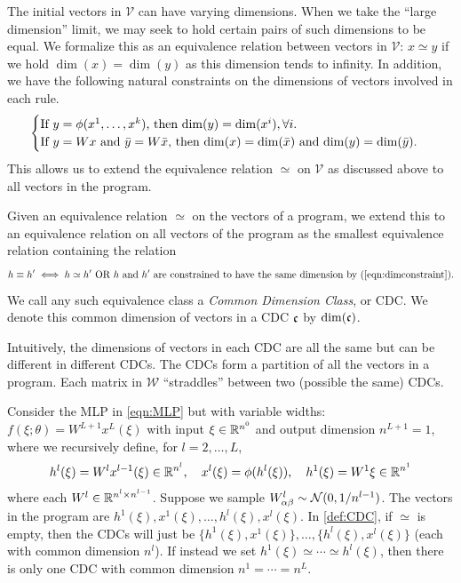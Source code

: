 \documentclass[main.tex]{subfiles}
\begin{document}
The initial vectors in $\mathcal{V}$ can have varying dimensions. When we take the ``large dimension'' limit, we may seek to hold certain pairs of such dimensions to be equal. We formalize this as an equivalence relation between vectors in $\mathcal{V}$: $x\simeq y$ if we hold $\dim(x)=\dim(y)$ as this dimension tends to infinity.
In addition, we have the following natural constraints on the dimensions of vectors involved in each rule.
\begin{equation}
\begin{cases}
\text{If \ensuremath{y=\phi(x^{1},\ldots,x^{k})}, then \ensuremath{\dim(y)=\dim(x^{i}),\forall i}.}\\
\text{If \ensuremath{y=Wx} and \ensuremath{\bar{y}=W\bar{x}}, then \ensuremath{\dim(x)=\dim(\bar{x})} and \ensuremath{\dim(y)=\dim(\bar{y})}.}
\end{cases}\label{eqn:dimconstraint}
\end{equation}
This allows us to extend the equivalence relation $\simeq$ on $\mathcal{V}$ as discussed above to all vectors in the program.
\begin{defn}
\label{def:CDC}
Given an equivalence relation $\simeq$ on the vectors of a program, we extend this to an equivalence relation on all vectors of the program as the smallest equivalence relation containing the relation
\begin{equation}
h\equiv h'\iff h\simeq h'\text{ OR \ensuremath{h} and \ensuremath{h'} are constrained to have the same dimension by (\ref{eqn:dimconstraint})}.
\end{equation}
We call any such equivalence class a \emph{Common Dimension Class}, or CDC. We denote this common dimension of vectors in a CDC $\mathfrak{c}$ by $\dim(\mathfrak{c})$.
\end{defn}

Intuitively, the dimensions of vectors in each CDC are all the same but can be different in different CDCs. The CDCs form a partition of all the vectors in a program. Each matrix in $\mathcal{W}$ ``straddles'' between two (possible the same) CDCs.

\begin{exmp}
    Consider the MLP in \cref{eqn:MLP} but with variable widths:
     $f(\xi; \theta) = W^{L+1} x^L(\xi)$ with input $\xi \in \mathbb{R}^{n^0}$ and output dimension $n^{L+1} = 1$, where we recursively define, for $l = 2, \ldots , L$,
\begin{align*}
    h^{l}(\xi)=W^{l}x^{l-1}(\xi)\in\mathbb{R}^{n^{l}},\quad x^{l}(\xi)=\phi(h^{l}(\xi)),\quad h^{1}(\xi)=W^{1}\xi\in\mathbb{R}^{n^{1}}
\end{align*}
where each $W^l \in \mathbb{R}^{n^l \times n^{l-1}}$.
Suppose we sample $W^l_{\alpha\beta} \sim \mathcal{N}(0,1/n^{l-1})$.
The vectors in the program are $h^1(\xi), x^1(\xi), \ldots, h^l(\xi), x^l(\xi)$.
In \cref{def:CDC}, if $\simeq$ is empty, then the CDCs will just be $\{h^1(\xi), x^1(\xi)\}, \ldots, \{h^l(\xi), x^l(\xi)\}$ (each with common dimension $n^l$).
If instead we set $h^1(\xi) \simeq \cdots \simeq h^l(\xi)$, then there is only one CDC with common dimension $n^1 = \cdots = n^L$.
\end{exmp}
\end{document}
